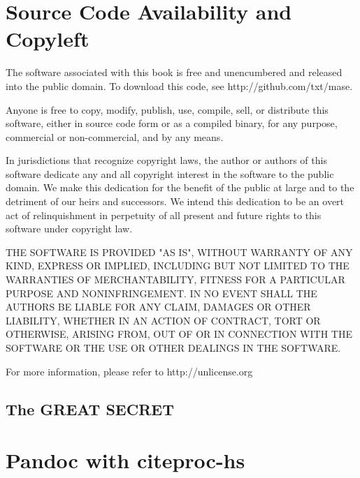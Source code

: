 \documentclass[9pt,twocolumn]{article}
\newcommand{\said}[1]{\citet*{#1}}
\begin{document}
\tableofcontents

\newpage



\section*{Source Code Availability and Copyleft}
The software associated with this book
is free and unencumbered and released into the public domain. To download this code, see http://github.com/txt/mase.

Anyone is free to copy, modify, publish, use, compile, sell, or
distribute this software, either in source code form or as a compiled
binary, for any purpose, commercial or non-commercial, and by any
means.

In jurisdictions that recognize copyright laws, the author or authors
of this software dedicate any and all copyright interest in the
software to the public domain. We make this dedication for the benefit
of the public at large and to the detriment of our heirs and
successors. We intend this dedication to be an overt act of
relinquishment in perpetuity of all present and future rights to this
software under copyright law.

THE SOFTWARE IS PROVIDED "AS IS", WITHOUT WARRANTY OF ANY KIND,
EXPRESS OR IMPLIED, INCLUDING BUT NOT LIMITED TO THE WARRANTIES OF
MERCHANTABILITY, FITNESS FOR A PARTICULAR PURPOSE AND NONINFRINGEMENT.
IN NO EVENT SHALL THE AUTHORS BE LIABLE FOR ANY CLAIM, DAMAGES OR
OTHER LIABILITY, WHETHER IN AN ACTION OF CONTRACT, TORT OR OTHERWISE,
ARISING FROM, OUT OF OR IN CONNECTION WITH THE SOFTWARE OR THE USE OR
OTHER DEALINGS IN THE SOFTWARE.

For more information, please refer to http://unlicense.org


\newpage








\subsection*{The GREAT SECRET}



\section{Pandoc with citeproc-hs}\label{pandoc-with-citeproc-hs}

\said{item3}


\end{document}
